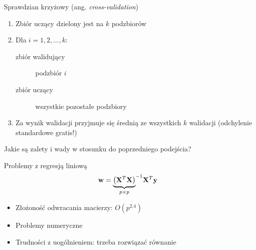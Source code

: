 \documentclass{sa}
\newcommand{\ang}[1]{(ang. \emph{#1})}
\renewcommand{\vec}[1]{\ensuremath\mathbf{#1}}
\begin{document}
\begin{frame}{Sprawdzian krzyżowy \ang{cross-validation}}
\begin{enumerate}
\item Zbiór uczący dzielony jest na $k$ podzbiorów
\item Dla $i=1,2,\ldots, k$:
\begin{description}
\item[zbiór walidujący] podzbiór $i$
\item[zbiór uczący]  wszystkie pozostałe podzbiory
\end{description}
\item Za wynik walidacji przyjmuje się średnią ze wszystkich $k$ walidacji (odchylenie standardowe gratis!)
\end{enumerate}

\vfill
Jakie są zalety i wady w stosunku do poprzedniego podejścia?
\end{frame}

\begin{frame}{Problemy z regresją liniową}
\[ \vec{w}={\underbrace{\left(\vec{X}^T\vec{X}\right)}_{p\times p}}^{-1}\vec{X}^T\vec{y} \]
\begin{itemize}
\item<+-> Złożoność odwracania macierzy: $O(p^{2.4})$ \\
\item<+-> Problemy numeryczne
\item<+-> Trudności z uogólnieniem: trzeba \alert{rozwiązać} równanie
\end{itemize}
\end{frame}
\end{document}
